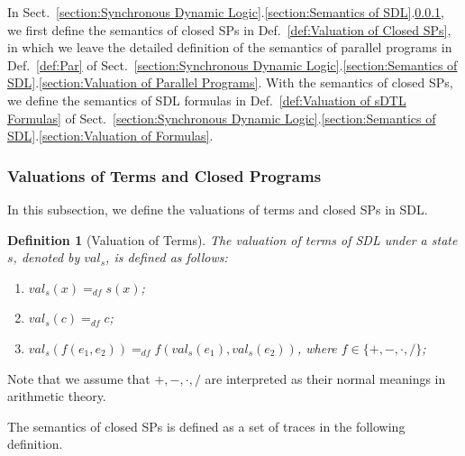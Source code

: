 \documentclass{fcs}
\newtheorem{mydef}{Definition}[section]
\newcommand{\val}[0]{\mathit{val}}
\newcommand{\dddef}[0]{=_{df}}
\begin{document}
In Sect.~\ref{section:Synchronous Dynamic Logic}.\ref{section:Semantics of SDL}.\ref{section:Valuations of Terms and Closed Programs}, we first define the semantics of closed SPs in Def.~\ref{def:Valuation of Closed SPs}, in which
we leave the detailed definition of the semantics of parallel programs in Def.~\ref{def:Par} of Sect.~\ref{section:Synchronous Dynamic Logic}.\ref{section:Semantics of SDL}.\ref{section:Valuation of Parallel Programs}.
With the semantics of closed SPs, we define the semantics of SDL formulas in Def.~\ref{def:Valuation of sDTL Formulas} of Sect.~\ref{section:Synchronous Dynamic Logic}.\ref{section:Semantics of SDL}.\ref{section:Valuation of Formulas}.




\subsubsection{Valuations of Terms and Closed Programs}
\label{section:Valuations of Terms and Closed Programs}
In this subsection, we define the valuations of terms  and closed SPs in SDL.


\begin{mydef}[Valuation of Terms]
	\label{def:Valuation}
	The valuation of terms of SDL under a state $s$, denoted by $\val_s$, is defined as follows:
	\begin{enumerate}
		\item $\val_s(x) \dddef s(x)$;
		\item $\val_s(c) \dddef c$;
		\item $\val_s(f(e_1, e_2))\dddef f(\val_s(e_1), \val_s(e_2))$, where $f\in \{+, -, \cdot, /\}$;
	\end{enumerate}
\end{mydef}
Note that we assume that $+, -, \cdot, /$ are interpreted as their normal meanings in arithmetic theory.

The semantics of closed SPs is defined as a set of traces in the following definition.
\end{document}
